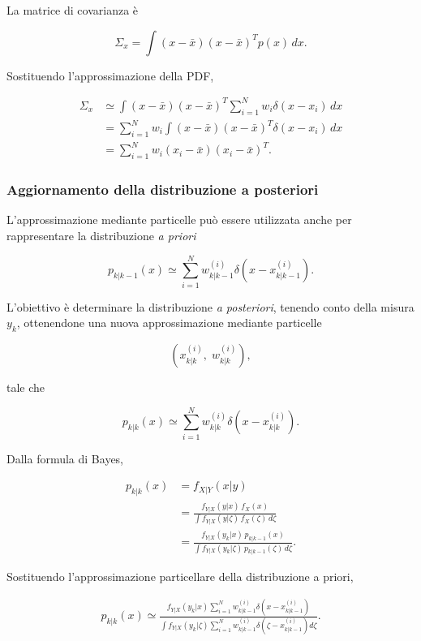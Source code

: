 \documentclass[11pt,a4paper]{article}
\begin{document}
La matrice di covarianza è

\[
\Sigma_x
=
\int
(x-\bar{x})
(x-\bar{x})^T
p(x)\,dx.
\]

Sostituendo l'approssimazione della PDF,

\[
\begin{aligned}
\Sigma_x
&\simeq
\int
(x-\bar{x})
(x-\bar{x})^T
\sum_{i=1}^{N}
w_i
\delta(x-x_i)\,dx
\\
&=
\sum_{i=1}^{N}
w_i
\int
(x-\bar{x})
(x-\bar{x})^T
\delta(x-x_i)\,dx
\\
&=
\boxed{
\sum_{i=1}^{N}
w_i
(x_i-\bar{x})
(x_i-\bar{x})^T.
}
\end{aligned}
\]

\subsubsection*{Aggiornamento della distribuzione a posteriori}

L'approssimazione mediante particelle può essere utilizzata anche per rappresentare la distribuzione \emph{a priori}

\[
\boxed{
p_{k|k-1}(x)
\simeq
\sum_{i=1}^{N}
w_{k|k-1}^{(i)}
\delta\!\left(x-x_{k|k-1}^{(i)}\right).
}
\]

L'obiettivo è determinare la distribuzione \emph{a posteriori}, tenendo conto della misura \(y_k\), ottenendone una nuova approssimazione mediante particelle

\[
\left(
x_{k|k}^{(i)},
\;
w_{k|k}^{(i)}
\right),
\]

tale che

\[
\boxed{
p_{k|k}(x)
\simeq
\sum_{i=1}^{N}
w_{k|k}^{(i)}
\delta\!\left(x-x_{k|k}^{(i)}\right).
}
\]

Dalla formula di Bayes,

\[
\begin{aligned}
p_{k|k}(x)
&=
f_{X|Y}(x|y)
\\
&=
\frac{
f_{Y|X}(y|x)\,f_X(x)
}{
\displaystyle
\int
f_{Y|X}(y|\zeta)\,
f_X(\zeta)\,
d\zeta
}
\\
&=
\frac{
f_{Y|X}(y_k|x)\,
p_{k|k-1}(x)
}{
\displaystyle
\int
f_{Y|X}(y_k|\zeta)\,
p_{k|k-1}(\zeta)\,
d\zeta
}.
\end{aligned}
\]

Sostituendo l'approssimazione particellare della distribuzione a priori,

\[
\begin{aligned}
p_{k|k}(x)
\simeq
\frac{
f_{Y|X}(y_k|x)
\displaystyle
\sum_{i=1}^{N}
w_{k|k-1}^{(i)}
\delta\!\left(x-x_{k|k-1}^{(i)}\right)
}{
\displaystyle
\int
f_{Y|X}(y_k|\zeta)
\sum_{i=1}^{N}
w_{k|k-1}^{(i)}
\delta\!\left(\zeta-x_{k|k-1}^{(i)}\right)
d\zeta
}.
\end{aligned}
\]
\end{document}
